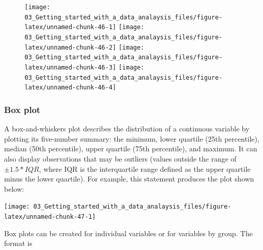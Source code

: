 \documentclass[
]{book}
\newenvironment{Shaded}{\begin{snugshade}}{\end{snugshade}}
\newcommand{\AttributeTok}[1]{\textcolor[rgb]{0.77,0.63,0.00}{#1}}
\newcommand{\DecValTok}[1]{\textcolor[rgb]{0.00,0.00,0.81}{#1}}
\newcommand{\FloatTok}[1]{\textcolor[rgb]{0.00,0.00,0.81}{#1}}
\newcommand{\FunctionTok}[1]{\textcolor[rgb]{0.00,0.00,0.00}{#1}}
\newcommand{\NormalTok}[1]{#1}
\newcommand{\SpecialCharTok}[1]{\textcolor[rgb]{0.00,0.00,0.00}{#1}}
\newcommand{\StringTok}[1]{\textcolor[rgb]{0.31,0.60,0.02}{#1}}
\begin{document}
\begin{figure}
\texttt{[image: 03\_Getting\_started\_with\_a\_data\_analaysis\_files/figure-latex/unnamed-chunk-46-1]} \texttt{[image: 03\_Getting\_started\_with\_a\_data\_analaysis\_files/figure-latex/unnamed-chunk-46-2]} \texttt{[image: 03\_Getting\_started\_with\_a\_data\_analaysis\_files/figure-latex/unnamed-chunk-46-3]} \texttt{[image: 03\_Getting\_started\_with\_a\_data\_analaysis\_files/figure-latex/unnamed-chunk-46-4]} \end{figure}

\hypertarget{box-plot}{%
\subsubsection{Box plot}\label{box-plot}}

A box-and-whiskers plot describes the distribution of a continuous variable by plotting its five-number summary: the minimum, lower quartile (25th percentile), median (50th percentile), upper quartile (75th percentile), and maximum. It can also display observations that may be outliers (values outside the range of \(\pm1.5*IQR\), where IQR is the interquartile range defined as the upper quartile minus the lower quartile). For example, this statement produces the plot shown below:

\begin{Shaded}
\end{Shaded}

\begin{center}\texttt{[image: 03\_Getting\_started\_with\_a\_data\_analaysis\_files/figure-latex/unnamed-chunk-47-1]} \end{center}

Box plots can be created for individual variables or for variables by group. The format is
\end{document}
